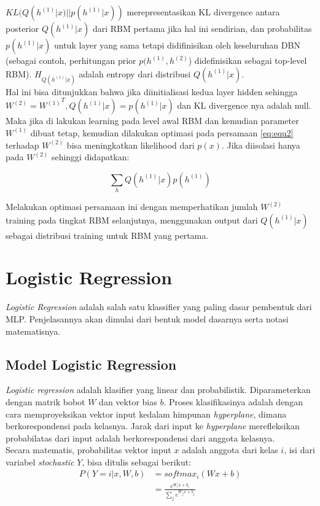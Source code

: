 $KL(Q(h^{(1)}|x) || p(h^{(1)}|x))$ merepresentasikan KL divergence antara posterior $Q(h^{(1)}|x)$ dari RBM pertama jika hal ini sendirian, dan probabilitas $p(h^{(1)}|x)$ untuk layer yang sama tetapi didifinisikan oleh keseluruhan DBN (sebagai contoh, perhitungan prior $p(h^{(1)},h^{(2)}$) didefinisikan sebagai top-level RBM). $H_{Q(h^{(1)}|x)}$ adalah entropy dari distribusi $Q(h^{(1)}|x)$.\\
Hal ini bisa ditunjukkan bahwa jika diinitialisasi kedua layer hidden sehingga $W^{(2)}={W^{(1)}}^T, Q(h^{(1)}|x)=p(h^{(1)}|x)$ dan KL divergence nya adalah null. Maka jika di lakukan learning pada level awal RBM dan kemudian parameter $ W^{(1)}$ dibuat tetap, kemudian dilakukan optimasi pada persamaan \ref{eq:equ2} terhadap $W^{(2)}$ bisa meningkatkan likelihood dari $p(x)$.
Jika diisolasi hanya pada $W^{(2)}$ sehinggi didapatkan:

\[\sum_h Q(h^{(1)}|x)p(h^{(1)})\]

Melakukan optimasi persamaan ini dengan memperhatikan jumlah $W^{(2)}$ training pada tingkat RBM selanjutnya, menggunakan output dari $Q(h^{(1)}|x)$ sebagai distribusi training untuk RBM yang pertama.

\section{Logistic Regression}
\textit{Logistic Regression} adalah salah satu klassifier yang paling dasar pembentuk dari MLP. Penjelasannya akan dimulai dari bentuk model dasarnya serta notasi matematisnya.

\subsection{Model Logistic Regression}
\textit{Logistic regression} adalah klasifier yang linear dan probabilistik. Diparameterkan dengan matrik bobot $W$ dan vektor bias $b$. Proses klasifikasinya adalah dengan cara memproyeksikan vektor input kedalam himpunan \textit{hyperplane}, dimana berkorespondensi pada kelasnya. Jarak dari input ke \textit{hyperplane} merefleksikan probabilatas dari input adalah berkorespondensi dari anggota kelasnya.\\
Secara matematis, probabilitas vektor input $x$ adalah anggota dari kelas $i$, isi dari variabel \textit{stochastic} $Y$, bisa ditulis sebagai berikut:
\begin{equation}
\begin{aligned}
P(Y=i|x, W,b) &= softmax_i(W x + b) \\
              &= \frac {e^{W_i x + b_i}} {\sum_j e^{W_j x + b_j}}
\end{aligned}
\end{equation}

